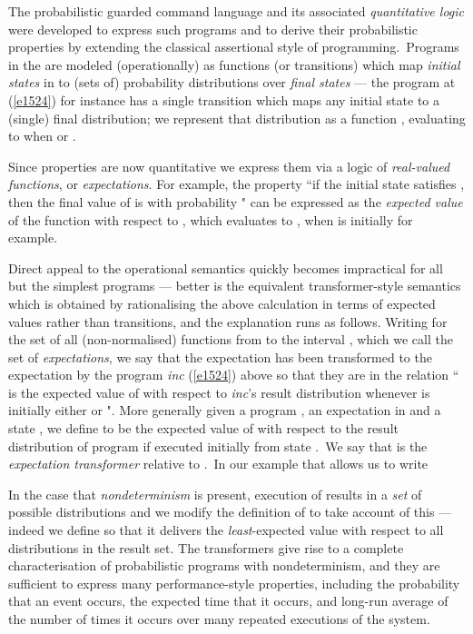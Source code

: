 \documentclass[numbers,copyright,creativecommons]{eptcs}
\newcommand{\Eqn}[1]{(\ref{#1})}
\begin{document}
The probabilistic guarded command language  \cite{ARP}  and its associated \emph{quantitative logic}
were developed to express such programs and to derive their probabilistic
properties by extending the classical assertional style of programming.\ Programs in the 
are modeled (operationally) as functions (or transitions) which
map \emph{initial states} in 
 to (sets of) probability distributions over \emph{final states} ---
 the program at \Eqn{e1524}
for instance has a single transition
 which
 maps any initial state  to a (single) final distribution; we represent that distribution as a
 function , evaluating to  when  or .

Since properties are now quantitative we express them via  a logic of
\emph{real-valued functions}, or \emph{expectations}.
   For example,
 the property ``if the initial state satisfies , then the final value of  is  with probability "
can be expressed as the \emph{expected value} of
the function 
with respect to , which evaluates to
, when  is initially  for example.

Direct appeal to the operational semantics quickly becomes
impractical for all but the simplest programs --- better is the equivalent transformer-style semantics which is
obtained by
rationalising the above calculation in terms of expected values rather than transitions, and the explanation
runs as follows.  Writing  for the set of all (non-normalised) functions from  to the interval ,
which we call the set of \emph{expectations}, we say that
the expectation  has been transformed to the expectation 
 by the program \textit{inc} (\ref{e1524}) above so that they are in the relation
 `` is the
 expected value of  with respect to \textit{inc}'s result distribution whenever  is initially either  or ".
More generally given a program , an expectation  in  and a state ,
we define  to be the expected value of  with respect to the
result distribution of program  if executed initially from state .\ We say that  is the \emph{expectation transformer} relative to .\ In our example that allows us to write
 
In the case that
\emph{nondeterminism} is present,  execution of  results in a \emph{set}
of possible distributions and we modify the definition
of  to take account of this --- indeed we define 
so that it  delivers the
\emph{least}-expected value with respect to all distributions in the result set.
The transformers \cite{ARP} give rise to a complete characterisation
of probabilistic programs with nondeterminism, and they are sufficient to
express many performance-style properties, including the probability that an event
occurs, the expected time that it occurs, and long-run
average of the number of times it occurs over many repeated executions of the system.
\end{document}
